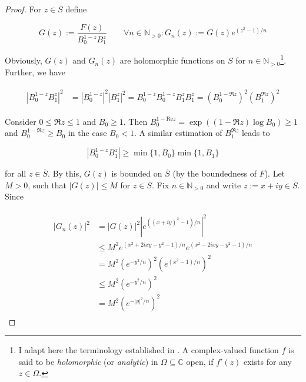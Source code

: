 \begin{proof}
	For $z \in \overline{S}$ define 

\begin{equation}
	G(z) := \frac{F(z)}{B_0^{1 - z}B_1^z} \qquad \forall n \in \mathbb{N}_{>0}: G_n(z) := G(z) e^{(z^2 - 1)/n} 
\end{equation}

	Obviously, $G(z)$ and $G_n(z)$ are holomorphic functions on $S$ for $n \in \mathbb{N}_{>0}$\footnote{
	I adapt here the terminology established in \cite[197]{rudin:rc_analysis:1987}. A complex-valued function $f$ is said to be \emph{holomorphic} (or \emph{analytic}) in $\Omega \subseteq \mathbb{C}$ open, if $f'(z)$ exists for any $z \in \Omega$.	
					}. Further, we have

\begin{gather}
	\begin{aligned}
		\left| B_0^{1 - z}B_1^z \right|^2 &= \left| B_0^{1 - z}\right|^2 \left| B_1^z \right|^2 = B_0^{1 - z}B_0^{1 - \overline{z}} B_1^z B_1^{\overline{z}} = \left( B_0^{1 -\Re z} \right)^2 \left( B_1^{\Re z} \right)^2 
	\end{aligned}
\end{gather}

	Consider $0 \leqslant \Re z \leqslant 1$ and $B_0 \geqslant 1$. Then  $B_0^{1 - \mathrm{Re}z} = \exp\left((1 - \Re z ) \log B_0\right) \geqslant 1$ and $B_0^{1 - \Re z } \geqslant B_0$ in the case $B_0 < 1$. A similar estimation of $B_1^{\Re z}$ leads to 

\begin{equation}
	\left| B_0^{1 - z}B_1^z \right| \geqslant \min\{1,B_0\}\min\{1,B_1\}
\end{equation}

	for all $z \in \overline{S}$. By this, $G(z)$ is bounded on $\overline{S}$ (by the boundedness of $F$). Let $M > 0$, such that $\left| G(z) \right| \leqslant M$ for $z \in \overline{S}$. Fix $n \in \mathbb{N}_{>0}$ and write $z := x + iy \in \overline{S}$. Since

\begin{gather}
	\begin{aligned}
	\left| G_n(z)\right|^2 &= \left| G(z) \right|^2 \left| e^{((x + iy)^2 - 1)/n} \right|^2\\
	& \leqslant M^2 e^{(x^2 + 2ixy -y^2 - 1)/n} e^{(x^2 - 2ixy -y^2 - 1)/n}\\
	&= M^2 \left( e^{-y^2/n} \right)^2 \left(e^{(x^2 - 1)/n}\right)^2\\
	&\leqslant M^2 \left(e^{-y^2/n}\right)^2\\
	&= M^2 \left( e^{-\left| y \right|^2/n} \right)^2
	\end{aligned}
\end{gather}


\end{proof}

